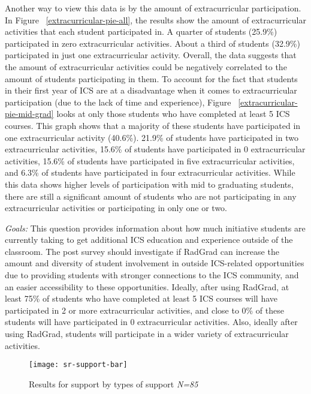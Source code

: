 \begin{enumerate}
Another way to view this data is by the amount of extracurricular participation. In Figure ~\ref{extracurricular-pie-all}, the results show the amount of extracurricular activities that each student participated in. A quarter of students (25.9\%) participated in zero extracurricular activities. About a third of students (32.9\%) participated in just one extracurricular activity. Overall, the data suggests that the amount of extracurricular activities could be negatively correlated to the amount of students participating in them. 
To account for the fact that students in their first year of ICS are at a disadvantage when it comes to extracurricular participation (due to the lack of time and experience), Figure ~\ref{extracurricular-pie-mid-grad} looks at only those students who have completed at least 5 ICS courses. This graph shows that a majority of these students have participated in one extracurricular activity (40.6\%). 21.9\% of students have participated in two extracurricular activities, 15.6\% of students have participated in 0 extracurricular activities, 15.6\% of students have participated in five extracurricular activities, and 6.3\% of students have participated in four extracurricular activities. While this data shows higher levels of participation with mid to graduating students, there are still a significant amount of students who are not participating in any extracurricular activities or participating in only one or two. 

\textit{Goals:} This question provides information about how much initiative students are currently taking to get additional ICS education and experience outside of the classroom. The post survey should investigate if RadGrad can increase the amount and diversity of student involvement in outside ICS-related opportunities due to providing students with stronger connections to the ICS community, and an easier accessibility to these opportunities. Ideally, after using RadGrad, at least 75\% of students who have completed at least 5 ICS courses will have participated in 2 or more extracurricular activities, and close to 0\% of these students will have participated in 0 extracurricular activities. Also, ideally after using RadGrad, students will participate in a wider variety of extracurricular activities.

\begin{figure}[h]
\centering
\texttt{[image: sr-support-bar]}
\caption{Results for support by types of support \textit{N=85}}
\label{support-bar}
\end{figure}


\end{enumerate}
